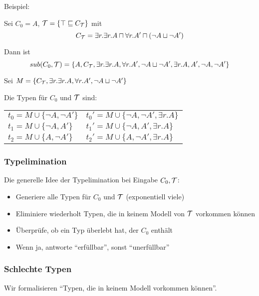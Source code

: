 \begin{tafel}\label{t:synTyp}

Beispiel:

Sei $C_0 = A$, $\mathcal{T} = \{\top \sqsubseteq C_{\mathcal{T}}\}$ mit $$C_{\mathcal{T}} = \exists r.\exists r.A \sqcap \forall r.A' \sqcap (\neg A \sqcup \neg A')$$

Dann ist $$sub(C_0, \mathcal{T}) = \{A, C_{\mathcal{T}}, \exists r.\exists r.A, \forall r.A',\neg A \sqcup \neg A', \exists r.A, A', \neg A, \neg A'\}$$

Sei $M = \{C_{\mathcal{T}}, \exists r.\exists r. A, \forall r.A', \neg A \sqcup \neg A'\}$

Die Typen für $C_0$ und $\mathcal{T}$ sind:

\begin{tabular}{ll}
    $t_0 = M \cup \{\neg A, \neg A'\}$ &  $t_0' = M \cup \{ \neg A, \neg A', \exists r.A\}$\\
    $t_1 = M \cup \{\neg A, A'\}$ & $t_1' = M \cup \{\neg A, A', \exists r.A\}$ \\
    $t_2 = M \cup \{A, \neg A'\}$ & $t_2' = M \cup \{A, \neg A', \exists r.A\}$\\
\end{tabular}
\end{tafel}

\subsubsection{Typelimination}\label{typelimination}

Die generelle Idee der Typelimination bei Eingabe $C_0, \mathcal{T}$:
\begin{itemize}
\item
  Generiere alle Typen für $C_{0}$ und $\mathcal{T}$ (exponentiell viele)
\item
  Eliminiere wiederholt Typen, die in keinem Modell von $\mathcal{T}$ vorkommen
  können
\item
  Überprüfe, ob ein Typ überlebt hat, der $C_{0}$ enthält
\item
    Wenn ja, antworte \enquote{erfüllbar}, sonst \enquote{unerfüllbar}
\end{itemize}

\subsubsection{Schlechte Typen}\label{schlechter-typ}

Wir formalisieren \enquote{Typen, die in keinem Modell vorkommen können}.

